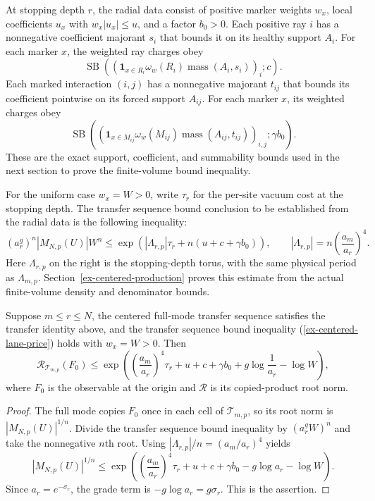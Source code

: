 At stopping depth $r$, the radial data consist of positive marker weights $w_x$, local coefficients $u_x$ with $w_x|u_x|\leq u$, and a factor $b_0>0$. Each positive ray $i$ has a nonnegative coefficient majorant $s_i$ that bounds it on its healthy support $A_i$. For each marker $x$, the weighted ray charges obey
\[
 \operatorname{SB}\!\left(\left(\mathbf 1_{x\in R_i}\omega_w(R_i)\operatorname{mass}(A_i,s_i)\right)_i;c\right).
\]
Each marked interaction $(i,j)$ has a nonnegative majorant $t_{ij}$ that bounds its coefficient pointwise on its forced support $A_{ij}$. For each marker $x$, its weighted charges obey
\[
 \operatorname{SB}\!\left(\left(\mathbf 1_{x\in M_{ij}}\omega_w(M_{ij})\operatorname{mass}(A_{ij},t_{ij})\right)_{i,j};\gamma b_0\right).
\]
These are the exact support, coefficient, and summability bounds used in the next section to prove the finite-volume bound inequality.

For the uniform case $w_x=W>0$, write $\tau_r$ for the per-site vacuum cost at the stopping depth. The transfer sequence bound conclusion to be established from the radial data is the following inequality:
\[
 (a_r^g)^n|M_{N,p}(U)|W^n
 \leq \exp\!\left(|\Lambda_{r,p}|\tau_r+n(u+c+\gamma b_0)\right),
 \qquad |\Lambda_{r,p}|=n\left(\frac{a_m}{a_r}\right)^4.
 \label{ex-centered-lane-price}
\]
Here $\Lambda_{r,p}$ on the right is the stopping-depth torus, with the same physical period as $\Lambda_{m,p}$. Section~\ref{ex-centered-production} proves this estimate from the actual finite-volume density and denominator bounds.

\begin{lemma}\label{ex-centered-lane-bound}
Suppose $m\leq r\leq N$, the centered full-mode transfer sequence satisfies the transfer identity above, and the transfer sequence bound inequality (\ref{ex-centered-lane-price}) holds with $w_x=W>0$. Then
\[
 \mathcal R_{\mathcal T_{m,p}}(F_0)
 \leq \exp\!\left(\left(\frac{a_m}{a_r}\right)^4\tau_r+u+c+\gamma b_0
                       +g\log\frac1{a_r}-\log W\right),
\]
where $F_0$ is the observable at the origin and $\mathcal R$ is its copied-product root norm.
\end{lemma}
\begin{proof}
The full mode copies $F_0$ once in each cell of $\mathcal T_{m,p}$, so its root norm is $|M_{N,p}(U)|^{1/n}$. Divide the transfer sequence bound inequality by $(a_r^gW)^n$ and take the nonnegative $n$th root. Using $|\Lambda_{r,p}|/n=(a_m/a_r)^4$ yields
\[
 |M_{N,p}(U)|^{1/n}
 \leq \exp\!\left(\left(\frac{a_m}{a_r}\right)^4\tau_r+u+c+\gamma b_0-g\log a_r-\log W\right).
\]
Since $a_r=e^{-\sigma_r}$, the grade term is $-g\log a_r=g\sigma_r$. This is the assertion.
\end{proof}

